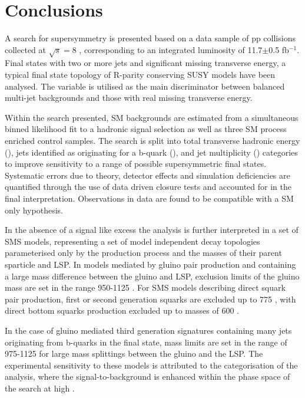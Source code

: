 \chapter{Conclusions}
\label{chap:conclusions}

A search for supersymmetry is presented based on a data sample of pp collisions collected at $\sqrt{s} = 8$ \TeV, corresponding to an integrated luminosity of 11.7$\pm$0.5 fb$^{-1}$. Final states with two or more jets and significant missing transverse energy, a typical final state topology of R-parity conserving \ac{SUSY} models have been analysed. The \alphat variable is utilised as the main discriminator between balanced multi-jet backgrounds and those with real missing transverse energy. 

Within the search presented, \acf{SM} backgrounds are estimated from a simultaneous binned likelihood fit to a hadronic signal selection as well as three \ac{SM} process enriched control samples. The search is split into total transverse hadronic energy (\theht), jets identified as originating for a b-quark (\nbreco), and jet multiplicity (\njet) categories to improve sensitivity to a range of possible supersymmetric final states. Systematic errors due to theory, detector effects and simulation deficiencies are quantified through the use of data driven closure tests and accounted for in the final interpretation. Observations in data are found to be compatible with a \ac{SM} only hypothesis. 

In the absence of a signal like excess the analysis is further interpreted in a set of \acf{SMS} models, representing a set of model independent decay topologies parameterised only by the production process and the masses of their parent sparticle and \acf{LSP}. In models mediated by gluino pair production and containing a large mass difference between the gluino and \ac{LSP}, exclusion limits of the gluino mass are set in the range 950-1125 \GeV. For \ac{SMS} models describing direct squark pair production, first or second generation squarks are excluded up to 775 \GeV, with direct bottom squarks production excluded up to masses of 600 \GeV. 

In the case of gluino mediated third generation signatures containing many jets originating from b-quarks in the final state, mass limits are set in the range of 975-1125 \GeV for large mass splittings between the gluino and the \ac{LSP}. The experimental sensitivity to these models is attributed to the \nbreco categorisation of the analysis, where the signal-to-background is enhanced within the phase space of the search at high \nbreco.

